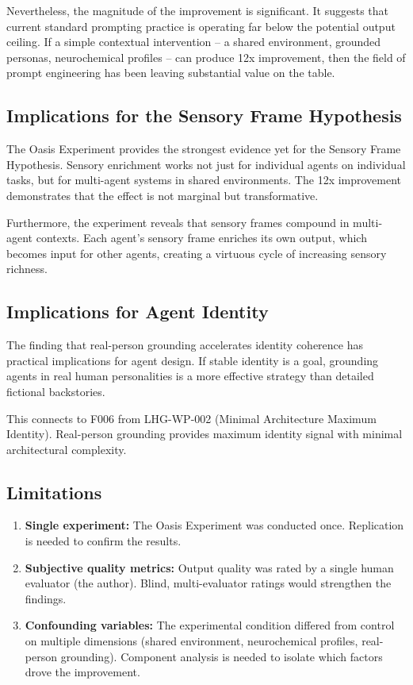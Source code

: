 \documentclass[11pt,a4paper]{article}
\begin{document}
Nevertheless, the magnitude of the improvement is significant. It suggests that current standard prompting practice is operating far below the potential output ceiling. If a simple contextual intervention -- a shared environment, grounded personas, neurochemical profiles -- can produce 12x improvement, then the field of prompt engineering has been leaving substantial value on the table.

\subsection{Implications for the Sensory Frame Hypothesis}

The Oasis Experiment provides the strongest evidence yet for the Sensory Frame Hypothesis. Sensory enrichment works not just for individual agents on individual tasks, but for multi-agent systems in shared environments. The 12x improvement demonstrates that the effect is not marginal but transformative.

Furthermore, the experiment reveals that sensory frames compound in multi-agent contexts. Each agent's sensory frame enriches its own output, which becomes input for other agents, creating a virtuous cycle of increasing sensory richness.

\subsection{Implications for Agent Identity}

The finding that real-person grounding accelerates identity coherence has practical implications for agent design. If stable identity is a goal, grounding agents in real human personalities is a more effective strategy than detailed fictional backstories.

This connects to F006 from LHG-WP-002 (Minimal Architecture Maximum Identity). Real-person grounding provides maximum identity signal with minimal architectural complexity.

\subsection{Limitations}

\begin{enumerate}
    \item \textbf{Single experiment:} The Oasis Experiment was conducted once. Replication is needed to confirm the results.
    \item \textbf{Subjective quality metrics:} Output quality was rated by a single human evaluator (the author). Blind, multi-evaluator ratings would strengthen the findings.
    \item \textbf{Confounding variables:} The experimental condition differed from control on multiple dimensions (shared environment, neurochemical profiles, real-person grounding). Component analysis is needed to isolate which factors drove the improvement.
\end{enumerate}
\end{document}

